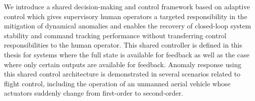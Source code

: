 We introduce a shared decision-making and control framework based on adaptive control which gives supervisory human operators a targeted responsibility in the mitigation of dynamical anomalies and enables the recovery of closed-loop system stability and command tracking performance without transferring control responsibilities to the human operator. This shared controller is defined in this thesis for systems where the full state is available for feedback as well as the case where only certain outputs are available for feedback. Anomaly response using this shared control architecture is demonstrated in several scenarios related to flight control, including the operation of an unmanned aerial vehicle whose actuators suddenly change from first-order to second-order. 